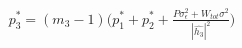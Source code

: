 \documentclass[preview]{standalone}
\begin{document}
\begin{align*}
p_3^\ast = \left(m_3 - 1\right) \Bigg( p_1^\ast + p_2^\ast + \frac{P \sigma_\epsilon^2 + W_{tot} \sigma^2}{\left|\hat{h_3}\right|^2} \Bigg)
\end{align*}
\end{document}
